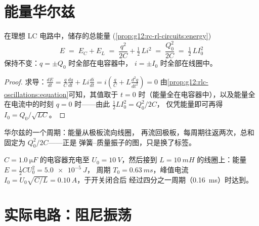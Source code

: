 \section{能量华尔兹}

\begin{proposition}[储存能量守恒]\label{prop:g12:rlc-oscillations:energy}
在理想 LC 电路中，储存的总能量
(\cref{prop:g12:rc-rl-circuits:energy})
\[
E \;=\; E_C + E_L \;=\; \frac{q^2}{2C} + \tfrac12\,L i^2
\;=\; \frac{Q_0^2}{2C} \;=\; \tfrac12\,L I_0^2
\]
保持不变：$q = \pm Q_0$ 时全部在电容器中，
$i = \pm I_0$ 时全部在线圈中。
\end{proposition}

\begin{proof}
求导：$\frac{dE}{dt} = \frac{q}{C}\frac{dq}{dt} +
Li\frac{di}{dt} = i\left(\frac{q}{C} + L\frac{d^2q}{dt^2}\right) = 0$
由\cref{prop:g12:rlc-oscillations:equation}可知，其值取于
$t = 0$ 时（能量全在电容器中），以及能量全在电流中的时刻
$q = 0$ 时——由此 $\tfrac12 L I_0^2 = Q_0^2/2C$，
仅凭能量即可再得 $I_0 = Q_0/\sqrt{LC}$。
\end{proof}

\begin{omfigure}

{\small 华尔兹的一个周期：能量从极板流向线圈，
再流回极板，每周期往返两次，总和固定为 $Q_0^2/2C$——正是
弹簧–质量振子的图，只是换了标签。}
\end{omfigure}

\begin{example}[华尔兹的测量]\label{ex:g12:rlc-oscillations:waltz}
$C = \qty{1.0}{\micro F}$ 的电容器充电至 $U_0 = \qty{10}{V}$，然后接到
$L = \qty{10}{mH}$ 的线圈上：能量 $E = \tfrac12 C U_0^2 = \qty{5.0e-5}{J}$，
周期 $T_0 = \qty{0.63}{ms}$，峰值电流
$I_0 = U_0\sqrt{C/L} = \qty{0.10}{A}$，于开关闭合后
经过四分之一周期（\qty{0.16}{ms}）时达到。
\end{example}

\section{实际电路：阻尼振荡}

